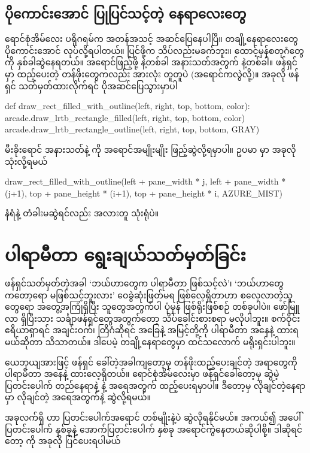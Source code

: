 \subsection*{ပိုကောင်းအောင် ပြုပြင်သင့်တဲ့ နေရာလေးတွေ}
ရောင်စုံအိမ်လေး ပရိုဂရမ်က အတန်အသင့် အဆင်ပြေနေပါပြီ။ တချို့နေရာလေးတွေ ပိုကောင်းအောင်  လုပ်လို့ရပါတယ်။ ပြင်ဖို့က သိပ်လည်းမခက်ဘူး။ ထောင့်မှန်စတုဂံတွေကို နှစ်ခါဆွဲနေရတယ်။ အရောင်ဖြည့်ဖို့  နဲ့တစ်ခါ အနားသတ်အတွက်  နဲ့တစ်ခါ။ ဖန်ရှင်မှာ ထည့်ပေးတဲ့ တန်ဖိုးတွေကလည်း အားလုံး တူတူပဲ (အရောင်ကလွဲလို့)။ အခုလို ဖန်ရှင် သတ်မှတ်ထားလိုက်ရင် ပိုအဆင်ပြေသွားမှာပါ
%
\begin{py}
def draw_rect_filled_with_outline(left, right, top, bottom, color):
    arcade.draw_lrtb_rectangle_filled(left, right, top, bottom, color)
    arcade.draw_lrtb_rectangle_outline(left, right, top, bottom, GRAY)
\end{py}
%
မီးခိုးရောင် အနားသတ်နဲ့  ကို အရောင်အမျိုးမျိုး ဖြည့်ဆွဲလို့ရမှာပါ။ ဥပမာ  မှာ အခုလို သုံးလို့ရမယ်
%
\begin{py}
draw_rect_filled_with_outline(left + pane_width * j,
                              left + pane_width * (j+1),
                              top + pane_height * (i+1),
                              top + pane_height * i,
                              AZURE_MIST)
\end{py}
%
နံရံနဲ့ တံခါးမဆွဲရင်လည်း အလားတူ သုံးရုံပဲ။

\section{ပါရာမီတာ ရွေးချယ်သတ်မှတ်ခြင်း}
ဖန်ရှင်သတ်မှတ်တဲ့အခါ ‘ဘယ်ဟာတွေက ပါရာမီတာ ဖြစ်သင့်လဲ’၊ ‘ဘယ်ဟာတွေကတော့ရော  မဖြစ်သင့်ဘူးလား’ ဝေခွဲဆုံးဖြတ်မရ ဖြစ်လေ့ရှိတာဟာ စလေ့လာတဲ့သူတွေရော အတွေ့အကြုံရှိပြီး သူတွေအတွက်ပါ ပုံမှန် ဖြစ်ရိုးဖြစ်စဉ် တစ်ခုပါပဲ။ ဖော်မြူလာ ရှိပြီးသား သင်္ချာဖန်ရှင်တွေအတွက်တော့ သိပ်ခေါင်းစားစရာ မလိုပါဘူး။ စက်ဝိုင်းဧရိယာရှာရင် အချင်းဝက်၊ တြိဂံဆိုရင် အခြေနဲ့ အမြင့်တို့ကို ပါရာမီတာ အနေနဲ့ ထားရမယ်ဆိုတာ သိသာတယ်။ ဒါပေမဲ့ တချို့နေရာတွေမှာ ထင်သလောက် မရိုးရှင်းပါဘူး။ 

ယေဘုယျအားဖြင့် ဖန်ရှင် ခေါ်တဲ့အခါကျတော့မှ တန်ဖိုးထည့်ပေးချင်တဲ့ အရာတွေကို ပါရာမီတာ အနေနဲ့ ထားလေ့ရှိတယ်။ ရောင်စုံအိမ်လေးမှာ  ဖန်ရှင်ခေါ်တော့မှ ဆွဲမဲ့ ပြတင်းပေါက် တည်နေရာနဲ့  နဲ့  အရေအတွက် ထည့်ပေးရမှာပါ။ ဒီတော့မှ လိုချင်တဲ့နေရာမှာ လိုချင်တဲ့  အရေအတွက်နဲ့ ဆွဲလို့ရမယ်။

အခုလက်ရှိ  ဟာ ပြတင်းပေါက်အရောင် တစ်မျိုးနဲ့ပဲ ဆွဲလိုရနိုင်မယ်။ အကယ်၍ အပေါ်ပြတင်းပေါက် နှစ်ခုနဲ့ အောက်ပြတင်းပေါက် နှစ်ခု အရောင်ကွဲနေတယ်ဆိုပါစို့။ ဒါဆိုရင်တော့  ကို အခုလို ပြင်ပေးရပါမယ်

